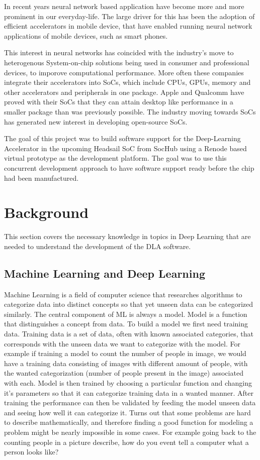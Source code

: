 \documentclass[12pt,a4paper,english
]{tunithesis}
\begin{document}
In recent years neural network based application have become more and more prominent in our everyday-life. The large driver for this has been the adoption of efficient accelerators in mobile device, that have enabled running neural network applications of mobile devices, such as smart phones.

This interest in neural networks has coincided with the industry's move to heterogenous System-on-chip solutions being used in consumer and professional devices, to imporove computational performance.
More often these companies integrate their accelerators into SoCs, which include CPUs, GPUs, memory and other accelerators and peripherals in one package. Apple and Qualcomm have proved with their SoCs that they can attain desktop like performance in a smaller package than was previously possible. The industry moving towards SoCs has generated new interest in developing open-source SoCs.

The goal of this project was to build software support for the Deep-Learning Accelerator in the upcoming Headsail SoC from SocHub using a Renode based virtual prototype as the development platform. The goal was to use this concurrent development approach to have software support ready before the chip had been manufactured.

\chapter{Background}
This section covers the necessary knowledge in topics in Deep Learning that are needed to understand the development of the DLA software.
\label{ch:background}
\section{Machine Learning and Deep Learning}
Machine Learning is a field of computer science that researches algorithms to categorize data into distinct concepts so that yet unseen data can be categorized similarly. The central component of ML is always a model. Model is a function that distinguishes a concept from data.
To build a model we first need training data. Training data is a set of data, often with known associated categories, that corresponds with the unseen data we want to categorize with the model. For example if training a model to count the number of people in image, we would have a training data consisting of images with different amount of people, with the wanted categorization (number of people present in the image) associated with each.
Model is then trained by choosing a particular function and changing it's parameters so that it can categorize training data in a wanted manner. After training the performance can then be validated by feeding the model unseen data and seeing how well it can categorize it.
Turns out that some problems are hard to describe mathematically, and therefore finding a good function for modeling a problem might be nearly impossible in some cases. For example going back to the counting people in a picture describe, how do you event tell a computer what a person looks like?
\end{document}
